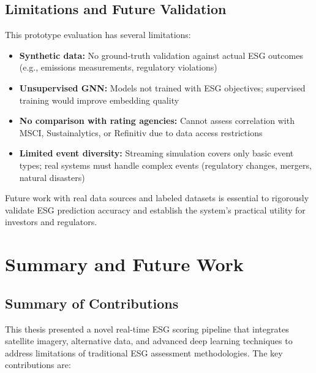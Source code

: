 \subsection{Limitations and Future Validation}

This prototype evaluation has several limitations:
\begin{itemize}
\item \textbf{Synthetic data:} No ground-truth validation against actual ESG outcomes (e.g., emissions measurements, regulatory violations)
\item \textbf{Unsupervised GNN:} Models not trained with ESG objectives; supervised training would improve embedding quality
\item \textbf{No comparison with rating agencies:} Cannot assess correlation with MSCI, Sustainalytics, or Refinitiv due to data access restrictions
\item \textbf{Limited event diversity:} Streaming simulation covers only basic event types; real systems must handle complex events (regulatory changes, mergers, natural disasters)
\end{itemize}

Future work with real data sources and labeled datasets is essential to rigorously validate ESG prediction accuracy and establish the system's practical utility for investors and regulators.

\clearpage
\section{Summary and Future Work}
\label{sec:summary}

\subsection{Summary of Contributions}

This thesis presented a novel real-time ESG scoring pipeline that integrates satellite imagery, alternative data, and advanced deep learning techniques to address limitations of traditional ESG assessment methodologies. The key contributions are:

